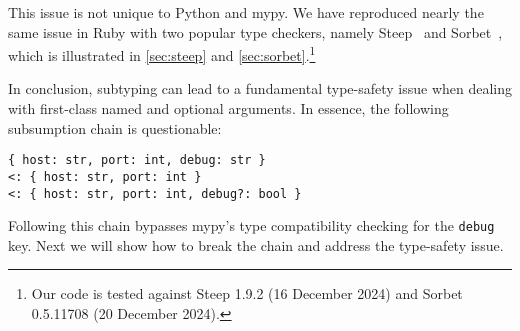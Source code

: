 This issue is not unique to Python and mypy. We have reproduced nearly the same
issue in Ruby with two popular type checkers, namely Steep~\citep{steep} and
Sorbet~\citep{sorbet}, which is illustrated in \autoref{sec:steep} and
\autoref{sec:sorbet}.\footnote{Our code is tested against Steep 1.9.2 (16
December 2024) and Sorbet 0.5.11708 (20 December 2024).}

In conclusion, subtyping can lead to a fundamental type-safety issue when
dealing with first-class named and optional arguments. In essence, the following
subsumption chain is questionable:
\begin{lstlisting}[language={[3]Python}]
   { host: str, port: int, debug: str }
<: { host: str, port: int }
<: { host: str, port: int, debug?: bool }
\end{lstlisting}
Following this chain bypasses mypy's type compatibility checking for the
\lstinline{debug} key. Next we will show how to break the chain and address the
type-safety issue.
